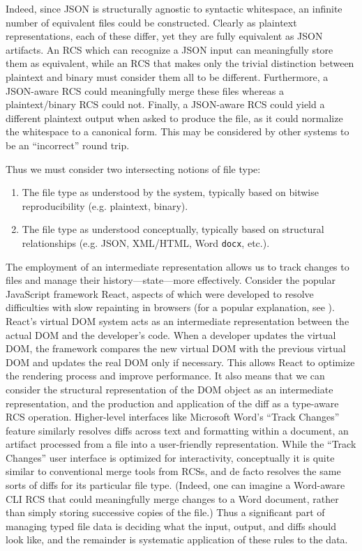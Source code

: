 \documentclass[twoside]{article}
\begin{document}
Indeed, since JSON is structurally agnostic to syntactic whitespace, an infinite number of equivalent files could be constructed.  Clearly as plaintext representations, each of these differ, yet they are fully equivalent as JSON artifacts.  An RCS which can recognize a JSON input can meaningfully store them as equivalent, while an RCS that makes only the trivial distinction between plaintext and binary must consider them all to be different.  Furthermore, a JSON-aware RCS could meaningfully merge these files whereas a plaintext/binary RCS could not.  Finally, a JSON-aware RCS could yield a different plaintext output when asked to produce the file, as it could normalize the whitespace to a canonical form.  This may be considered by other systems to be an ``incorrect'' round trip.

Thus we must consider two intersecting notions of file type:
\begin{enumerate}
  \item The file type as understood by the system, typically based on bitwise reproducibility (e.g. plaintext, binary).
  \item The file type as understood conceptually, typically based on structural relationships (e.g. JSON, XML/HTML, Word \texttt{docx}, etc.).
\end{enumerate}

\noindent
The employment of an intermediate representation allows us to track changes to files and manage their history—state—more effectively.  Consider the popular JavaScript framework React, aspects of which were developed to resolve difficulties with slow repainting in browsers (for a popular explanation, see \citet{Arora2017}).  React's virtual DOM system acts as an intermediate representation between the actual DOM and the developer's code.  When a developer updates the virtual DOM, the framework compares the new virtual DOM with the previous virtual DOM and updates the real DOM only if necessary.  This allows React to optimize the rendering process and improve performance.  It also means that we can consider the structural representation of the DOM object as an intermediate representation, and the production and application of the diff as a type-aware RCS operation.
Higher-level interfaces like Microsoft Word's “Track Changes” feature \citep{MS2024} similarly resolves diffs across text and formatting within a document, an artifact processed from a file into a user-friendly representation.  While the “Track Changes” user interface is optimized for interactivity, conceptually it is quite similar to conventional merge tools from RCSs, and de facto resolves the same sorts of diffs for its particular file type.  (Indeed, one can imagine a Word-aware CLI RCS that could meaningfully merge changes to a Word document, rather than simply storing successive copies of the file.)
Thus a significant part of managing typed file data is deciding what the input, output, and diffs should look like, and the remainder is systematic application of these rules to the data.
\end{document}
